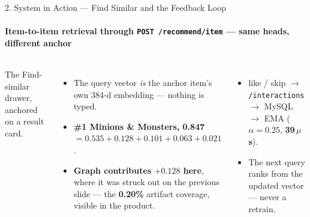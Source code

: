 \begin{frame}[shrink]{2. System in Action --- Find Similar and the Feedback Loop}
\framesubtitle{Item-to-item retrieval through \texttt{POST /recommend/item} --- same heads, different anchor}
\vspace{0.5mm}
\begin{columns}[T]
\vspace{-1mm}
\begin{center}
%
{The Find-similar drawer, anchored on a result card.}
\end{center}

\begin{itemize}\scriptsize\setlength{\itemsep}{3pt}
  \item The query vector \emph{is} the anchor item's own 384-d embedding --- nothing is typed.
  \item \textbf{\#1 Minions \& Monsters, 0.847}
        $= 0.535 + 0.128 + 0.101 + 0.063 + 0.021$.
  \item \textcolor{amritaMaroon}{\textbf{Graph contributes $+0.128$ here}}, where it was struck out
        on the previous slide --- the \textbf{0.20\%} artifact coverage, visible in the product.
\end{itemize}
\vspace{1mm}
\begin{itemize}\scriptsize\setlength{\itemsep}{3pt}
  \item like / skip $\rightarrow$ \texttt{/interactions} $\rightarrow$ MySQL $\rightarrow$ EMA
        ($\alpha = 0.25$, \textbf{39\,$\mu$s}).
  \item The next query ranks from the updated vector --- never a retrain.
\end{itemize}
\end{columns}
\end{frame}
